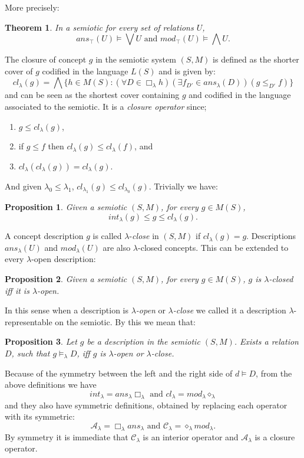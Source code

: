 \documentclass[oribibl]{llncs}
\newtheorem{thm}{Theorem}
\newtheorem{prop}{Proposition}
\newcommand{\A}{\mathcal{A}}
\newcommand{\C}{\mathcal{C}}
\begin{document}
More precisely:

\begin{thm}
In a semiotic for every set of relations $U$,
\[ans_\top(U)\models\bigvee U \text{ and }mod_\top(U)\models\bigwedge U.\]
\end{thm}

The closure of concept $g$ in the semiotic system $(S,M)$ is defined
as the shorter cover of $g$ codified in the language $L(S)$  and
is given by:
\[ cl_\lambda(g)=\bigwedge\{h\in M(S): (\forall D\in \Box_\lambda h)(\exists f_{D'}\in ans_\lambda(D))(g \leq_{D'} f)\}\]
and can be seen as the shortest cover containing $g$ and codified in
the language associated to the semiotic. It is a \emph{closure
operator} since;
\begin{enumerate}
  \item $g\leq cl_\lambda(g)$,
  \item if $g\leq f$ then $cl_\lambda(g)\leq cl_\lambda(f)$, and
  \item $cl_\lambda(cl_\lambda(g))= cl_\lambda(g)$.
\end{enumerate}
And given $\lambda_0\leq\lambda_1$, $cl_{\lambda_1}(g)\leq
cl_{\lambda_0}(g)$. Trivially we have:

\begin{prop}
Given a semiotic $(S,M)$, for every $g\in M(S)$,
\[int_\lambda(g)\leq g \leq cl_\lambda(g).\]
\end{prop}

A concept description $g$ is called $\lambda$-\emph{close} in
$(S,M)$ if
$cl_\lambda(g)= g$.
Descriptions $ans_\lambda(U)$ and $mod_\lambda(U)$ are also
$\lambda$-closed concepts. This can be extended to every
$\lambda$-open description:

\begin{prop}
Given a semiotic $(S,M)$, for every $g\in M(S)$, $g$ is
$\lambda$-closed iff it is $\lambda$-open.
\end{prop}

In this sense when a description is $\lambda$\emph{-open} or
$\lambda$\emph{-close} we called it a description $\lambda$-representable
on the semiotic. By this we mean that:

\begin{prop}
Let $g$ be a description in the semiotic $(S,M)$. Exists a relation
$D$, such that $g\models_\lambda D$, iff $g$ is $\lambda$-open or
$\lambda$-close.
\end{prop}

Because of the symmetry between the left and the right side of
$d\models D$, from the above definitions we have
\[int_\lambda=ans_\lambda\Box_\lambda \text { and }
cl_\lambda=mod_\lambda\diamond_\lambda\] and they also have
symmetric definitions, obtained by replacing each operator with its
symmetric:
\[\A_\lambda=\Box_\lambda ans_\lambda \text{ and } \C_\lambda=\diamond_\lambda mod_\lambda.\]
 By symmetry it is immediate that $\C_\lambda$ is an interior operator and $\A_\lambda$ is a
closure operator.
\end{document}

